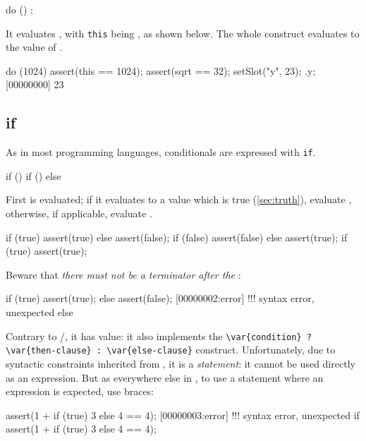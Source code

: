 \begin{urbiunchecked}
do ()
{
};
\end{urbiunchecked}

It evaluates , with \lstinline|this| being , as
shown below.  The whole construct evaluates to the value
of .

\begin{urbiscript}[firstnumber=last]
do (1024)
{
  assert(this == 1024);
  assert(sqrt == 32);
  setSlot("y", 23);
}.y;
[00000000] 23
\end{urbiscript}


\subsection{if}
\label{sec:lang:if}
As in most programming languages, conditionals are expressed with
\lstinline|if|.

\begin{urbiunchecked}
if () 
if ()  else 
\end{urbiunchecked}

First  is evaluated; if it evaluates to a value which
is true (\autoref{sec:truth}), evaluate , otherwise,
if applicable, evaluate .

\begin{urbiscript}[firstnumber=last]
if (true) assert(true) else assert(false);
if (false) assert(false) else assert(true);
if (true) assert(true);
\end{urbiscript}

Beware that \emph{there must not be a terminator after the
  }:

\begin{urbiscript}[firstnumber=last]
if (true)
  assert(true);
else
  assert(false);
[00000002:error] !!! syntax error, unexpected else
\end{urbiscript}

Contrary to \C/\Cxx, it has value: it also implements the
\lstinline|\var{condition} ? \var{then-clause} : \var{else-clause}|
construct.  Unfortunately, due to syntactic constraints inherited from
\C, it is a \emph{statement}: it cannot be used directly as an
expression.  But as everywhere else in \us, to use a statement where
an expression is expected, use braces:

\begin{urbiscript}[firstnumber=last]
assert(1 + if (true) 3 else 4 == 4);
[00000003:error] !!! syntax error, unexpected if
assert(1 + { if (true) 3 else 4 } == 4);
\end{urbiscript}

